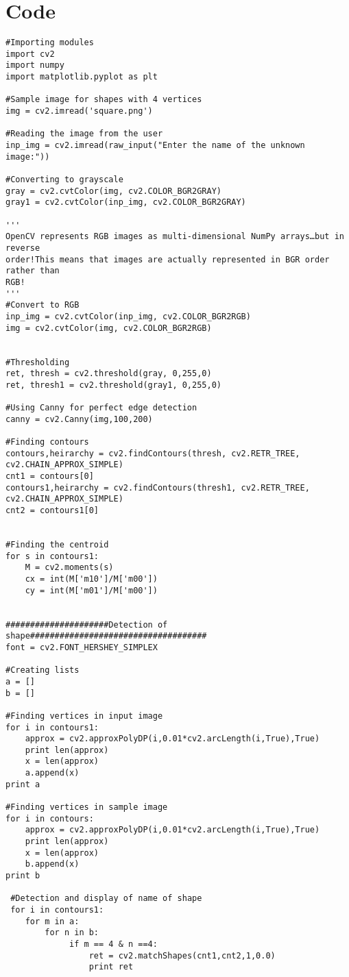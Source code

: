 \documentclass[]{article}
\begin{document}
\section{Code}\label{code}

\begin{verbatim}
#Importing modules
import cv2 
import numpy
import matplotlib.pyplot as plt

#Sample image for shapes with 4 vertices
img = cv2.imread('square.png')

#Reading the image from the user
inp_img = cv2.imread(raw_input("Enter the name of the unknown image:"))

#Converting to grayscale
gray = cv2.cvtColor(img, cv2.COLOR_BGR2GRAY)
gray1 = cv2.cvtColor(inp_img, cv2.COLOR_BGR2GRAY)

'''
OpenCV represents RGB images as multi-dimensional NumPy arrays…but in reverse
order!This means that images are actually represented in BGR order rather than
RGB!
'''
#Convert to RGB
inp_img = cv2.cvtColor(inp_img, cv2.COLOR_BGR2RGB)
img = cv2.cvtColor(img, cv2.COLOR_BGR2RGB)


#Thresholding
ret, thresh = cv2.threshold(gray, 0,255,0)
ret, thresh1 = cv2.threshold(gray1, 0,255,0)

#Using Canny for perfect edge detection
canny = cv2.Canny(img,100,200)

#Finding contours
contours,heirarchy = cv2.findContours(thresh, cv2.RETR_TREE, cv2.CHAIN_APPROX_SIMPLE)
cnt1 = contours[0]
contours1,heirarchy = cv2.findContours(thresh1, cv2.RETR_TREE, cv2.CHAIN_APPROX_SIMPLE)
cnt2 = contours1[0]


#Finding the centroid
for s in contours1:
    M = cv2.moments(s)
    cx = int(M['m10']/M['m00'])
    cy = int(M['m01']/M['m00'])


#####################Detection of shape#################################### 
font = cv2.FONT_HERSHEY_SIMPLEX

#Creating lists
a = []
b = []

#Finding vertices in input image
for i in contours1:
    approx = cv2.approxPolyDP(i,0.01*cv2.arcLength(i,True),True)
    print len(approx)
    x = len(approx)
    a.append(x)
print a    

#Finding vertices in sample image
for i in contours:
    approx = cv2.approxPolyDP(i,0.01*cv2.arcLength(i,True),True)
    print len(approx)
    x = len(approx)
    b.append(x)
print b      

 #Detection and display of name of shape
 for i in contours1:
    for m in a:
        for n in b:
             if m == 4 & n ==4:
                 ret = cv2.matchShapes(cnt1,cnt2,1,0.0)
                 print ret
            

\end{verbatim}
\end{document}
